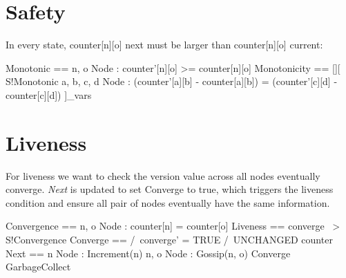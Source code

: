\section{Safety}

In every state, counter[n][o] next must be larger than counter[n][o] current:\newline

\begin{tla}
Monotonic == \A n, o \in Node : counter'[n][o] >= counter[n][o] 
Monotonicity == [][
    \/ S!Monotonic
    \/ \A a, b, c, d \in Node :
        (counter'[a][b] - counter[a][b]) = (counter'[c][d] - counter[c][d])
]_vars
\end{tla}
\begin{tlatex}
\@x{ Monotonicity \.{\defeq} {\Box} [}%
%
%
\@x{ ]_{ vars}}%
\end{tlatex}

\section{Liveness}

For liveness we want to check the version value across all nodes eventually
converge. \textit{Next} is updated to set Converge to true, which triggers the
liveness condition and ensure all pair of nodes eventually have the same
information. \newline

\begin{tla}
Convergence == \A n, o \in Node : counter[n] = counter[o]
Liveness == converge ~> S!Convergence
Converge ==
    /\ converge' = TRUE
    /\ UNCHANGED counter  
Next ==
  \/ \E n \in Node : Increment(n)
  \/ \E n, o \in Node : Gossip(n, o)
  \/ Converge
  \/ GarbageCollect
\end{tla}
\begin{tlatex}
%
%
%
%
%
%
%
\end{tlatex}

